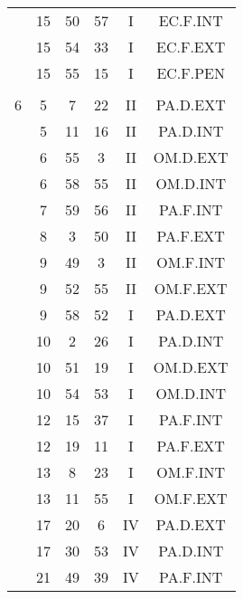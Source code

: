 \documentclass[12pt, a4paper]{article}
\begin{document}
\begin{multicols}{3}
{\begin{tabular}{c c c c c c}
	 	 	 	 & 15 & 50 & 57 & I & EC.F.INT\\%
	 	 	 	 & 15 & 54 & 33 & I & EC.F.EXT\\%
	 	 	 	 & 15 & 55 & 15 & I & EC.F.PEN\\%
	 	 	 	 & & & & & \\%
	 	 	 	6 & 5 & 7 & 22 & II & PA.D.EXT\\%
	 	 	 	 & 5 & 11 & 16 & II & PA.D.INT\\%
	 	 	 	 & 6 & 55 & 3 & II & OM.D.EXT\\%
	 	 	 	 & 6 & 58 & 55 & II & OM.D.INT\\%
	 	 	 	 & 7 & 59 & 56 & II & PA.F.INT\\%
	 	 	 	 & 8 & 3 & 50 & II & PA.F.EXT\\%
	 	 	 	 & 9 & 49 & 3 & II & OM.F.INT\\%
	 	 	 	 & 9 & 52 & 55 & II & OM.F.EXT\\%
	 	 	 	 & 9 & 58 & 52 & I & PA.D.EXT\\%
	 	 	 	 & 10 & 2 & 26 & I & PA.D.INT\\%
	 	 	 	 & 10 & 51 & 19 & I & OM.D.EXT\\%
	 	 	 	 & 10 & 54 & 53 & I & OM.D.INT\\%
	 	 	 	 & 12 & 15 & 37 & I & PA.F.INT\\%
	 	 	 	 & 12 & 19 & 11 & I & PA.F.EXT\\%
	 	 	 	 & 13 & 8 & 23 & I & OM.F.INT\\%
	 	 	 	 & 13 & 11 & 55 & I & OM.F.EXT\\%
	 	 	 	 & 17 & 20 & 6 & IV & PA.D.EXT\\%
	 	 	 	 & 17 & 30 & 53 & IV & PA.D.INT\\%
	 	 	 	 & 21 & 49 & 39 & IV & PA.F.INT\\%

\end{tabular}}
\end{multicols}
\end{document}
